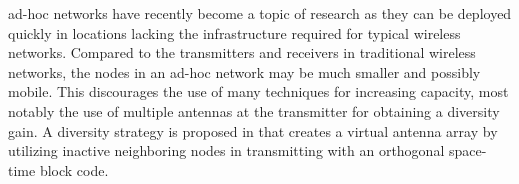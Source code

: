  ad-hoc networks have recently become a topic of research as they can be deployed quickly in locations lacking the infrastructure required for typical wireless networks.
Compared to the transmitters and receivers in traditional wireless networks, the nodes in an ad-hoc network may be much smaller and possibly mobile.
This discourages the use of many techniques for increasing capacity, most notably the use of multiple antennas at the transmitter for obtaining a diversity gain.
A diversity strategy is proposed in \cite{4686273} that creates a virtual antenna array by utilizing inactive neighboring nodes in transmitting with an orthogonal space-time block code.